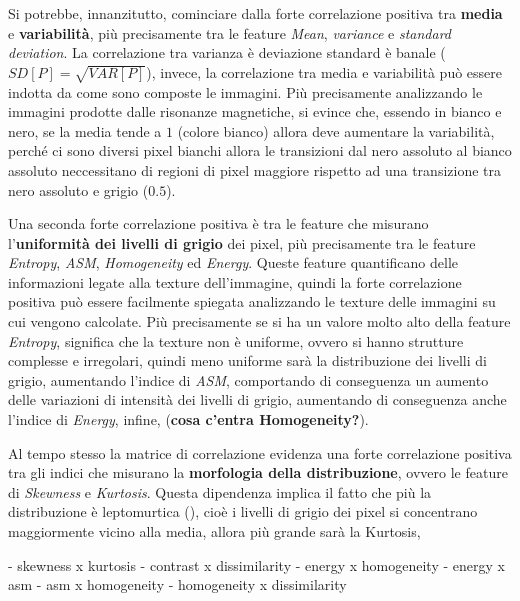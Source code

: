 Si potrebbe, innanzitutto, cominciare dalla forte correlazione positiva
tra \textbf{media} e \textbf{variabilità}, più precisamente tra le feature \textit{Mean},
\textit{variance} e \textit{standard deviation}. La correlazione tra varianza è 
deviazione standard è banale ($SD[P] = \sqrt{VAR[P]}$), invece, la correlazione tra media 
e variabilità può essere indotta da come sono composte le immagini. Più precisamente 
analizzando le immagini prodotte dalle risonanze magnetiche, si evince che, essendo in 
bianco e nero, se la media tende a $1$ (colore bianco) allora deve aumentare la 
variabilità, perché ci sono diversi pixel bianchi allora le transizioni dal nero assoluto
al bianco assoluto neccessitano di regioni di pixel maggiore rispetto ad una 
transizione tra nero assoluto e grigio ($0.5$). 

Una seconda forte correlazione positiva è 
tra le feature che misurano l'\textbf{uniformità dei livelli di grigio} dei pixel,
più precisamente tra le feature \textit{Entropy}, \textit{ASM}, \textit{Homogeneity} 
ed \textit{Energy}. Queste feature quantificano delle informazioni legate alla
texture dell'immagine, quindi la forte correlazione positiva può essere facilmente
spiegata analizzando le texture delle immagini su cui vengono calcolate. Più precisamente
se si ha un valore molto alto della feature \textit{Entropy}, significa che la
texture non è uniforme, ovvero si hanno strutture complesse e irregolari, quindi
meno uniforme sarà la distribuzione dei livelli di grigio, aumentando l'indice
di \textit{ASM}, comportando di conseguenza un aumento delle variazioni di intensità
dei livelli di grigio, aumentando di conseguenza anche l'indice di \textit{Energy},
infine, (\textbf{cosa c'entra Homogeneity?}). 

Al tempo stesso la matrice di correlazione evidenza una forte correlazione positiva
tra gli indici che misurano la \textbf{morfologia della distribuzione}, ovvero 
le feature di \textit{Skewness} e \textit{Kurtosis}. Questa dipendenza implica il 
fatto che più la distribuzione è leptomurtica (), cioè i livelli di grigio dei pixel si concentrano 
maggiormente vicino alla media, allora più grande sarà la Kurtosis, 






    - skewness x kurtosis
    - contrast x dissimilarity
    - energy x homogeneity
    - energy x asm
    - asm x homogeneity
    - homogeneity x dissimilarity

